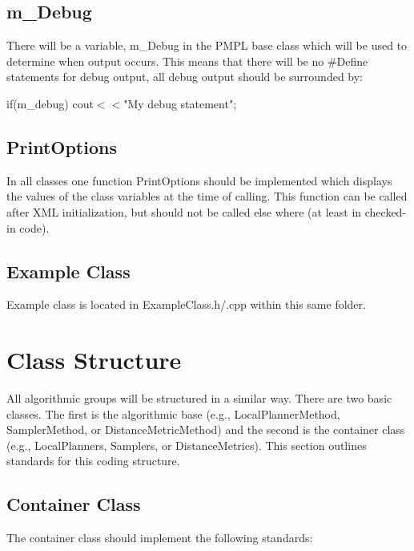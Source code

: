 \documentclass[12pt]{article}
\begin{document}
\subsection{m\_Debug}
There will be a variable, m\_Debug in the PMPL base class which will be used to determine when output occurs. This means
that there will be no \#Define statements for debug output, all debug output should be surrounded by:

if(m\_debug) cout$<<$"My debug statement";

\subsection{PrintOptions}
In all classes one function PrintOptions should be implemented which displays the values of the class variables at the
time of calling. This function can be called after XML initialization, but should not be called else where (at least in
checked-in code).

\subsection{Example Class}
Example class is located in ExampleClass.h/.cpp within this same folder.


\section{Class Structure}
All algorithmic groups will be structured in a similar way. There are two basic classes. The first is the algorithmic
base (e.g., LocalPlannerMethod, SamplerMethod, or DistanceMetricMethod) and the second is the container class (e.g.,
LocalPlanners, Samplers, or DistanceMetrics). This section outlines standards for this coding structure.

\subsection{Container Class}
The container class should implement the following standards:
\end{document}
